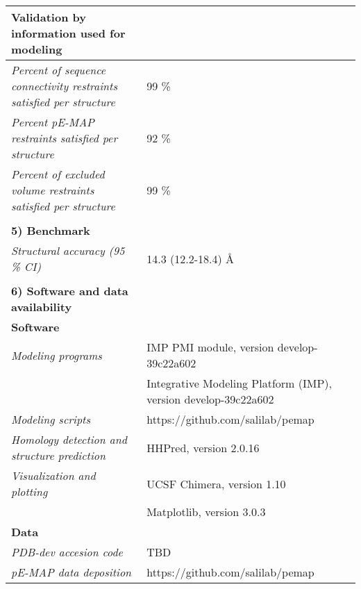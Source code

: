 \documentclass[8pt,a4paper]{article}
\begin{document}
\begin{longtable}{ p{} | p{} }
  \textbf{Validation by information used for modeling} & \\
  \hline
          \textit{Percent of sequence connectivity restraints satisfied per structure} & 99 \%\\
                \textit{Percent pE-MAP restraints satisfied per structure} & 92 \%\\
                \textit{Percent of excluded volume restraints satisfied per structure} & 99 \%\\
          &  \\
  
  \textbf{5) Benchmark} & \\
  \hline
          \textit{Structural accuracy (95 \% CI)} & 14.3 (12.2-18.4) \AA\\
          
   &  \\
  \normalsize{\textbf{6) Software and data availability}} & \\
    \hline
   \textbf{Software} & \\
   \hline
             \textit{Modeling programs} & IMP PMI module, version develop-39c22a602\\
             & Integrative Modeling Platform (IMP), version develop-39c22a602 \\
                  \textit{Modeling scripts} & https://github.com/salilab/pemap\\
                  \textit{Homology detection and structure prediction} & HHPred, version 2.0.16\\
                  \textit{Visualization and plotting} & UCSF Chimera, version 1.10\\
             & Matplotlib, version 3.0.3  \\
          \hline

  \textbf{Data} & \\
    \hline
            \textit{PDB-dev accesion code} & TBD\\
                  \textit{pE-MAP data deposition} & https://github.com/salilab/pemap\\
          \hline
  
\end{longtable}
\end{document}
